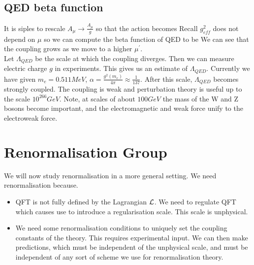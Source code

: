 \documentclass{article}
\begin{document}
\subsection{QED beta function} 
It is siples to rescale $A_\mu \to \frac{A_\mu}{g}$ so that the action becomes 
Recall $g_{eff}^2$ does not depend on $\mu$ so we can compute the beta function of QED to be 
We can see that the coupling grows as we move to a higher $\mu^\prime$. \\
Let $\Lambda_{QED}$ be the scale at which the coupling diverges. Then 
we can measure electric charge $g$ in experiments. This gives us an estimate of $\Lambda_{QED}$. Currently we have 
given $m_e = 0.511 MeV$, $\alpha = \frac{g^2(m_e)}{4\pi} \approx \frac{1}{137}$. After this scale, $\Lambda_{QED}$ becomes strongly coupled. The coupling is weak and perturbation theory is useful up to the scale $10^{266} GeV$. Note, at scales of about $100 GeV$ the mass of the W and Z bosons become important, and the electromagnetic and weak force unify to the electroweak force. 

\section{Renormalisation Group}

We will now study renormalisation in a more general setting. We need renormalisation because.  
\begin{itemize}
\item QFT is not fully defined by the Lagrangian $\mathcal{L}$. We need to regulate QFT which causes use to introduce a regularisation scale. This scale is unphysical. 
\item We need some renormalisation conditions to uniquely set the coupling constants of the theory. This requires experimental input. We can then make predictions, which must be independent of the unphysical scale, and must be independent of any sort of scheme we use for renormalisation theory. 
\end{itemize}
\end{document}
